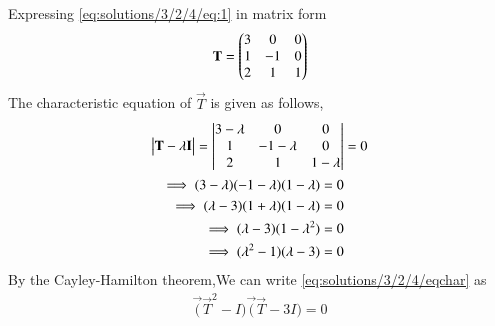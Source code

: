 Expressing \eqref{eq:solutions/3/2/4/eq:1} in matrix form
\begin{align}
    \mathbf{T}=\begin{pmatrix}3&0&0\\1&-1&0\\2&1&1\end{pmatrix}\label{eq:solutions/3/2/4/eq:2.1}
\end{align}    
The characteristic equation of $\vec{T}$ is given as follows,
\begin{align}
\begin{vmatrix}\mathbf{T}-\lambda\mathbf{I}\end{vmatrix} = \begin{vmatrix}3-\lambda&0&0\\1&-1-\lambda&0\\2&1&1-\lambda\end{vmatrix} &= 0\\
\implies(3-\lambda)(-1-\lambda)(1-\lambda)=0 \nonumber\\
\implies(\lambda-3)(1+\lambda)(1-\lambda)=0 \nonumber\\
\implies(\lambda-3)(1-\lambda^2)=0\nonumber\\
\implies(\lambda^2-1)(\lambda-3)=0\label{eq:solutions/3/2/4/eqchar}
\end{align}
By the Cayley-Hamilton theorem,We can write \eqref{eq:solutions/3/2/4/eqchar} as
\begin{align}
    \vec(\vec{T}^2-I)\vec(\vec{T}-3I)=0
\end{align}
